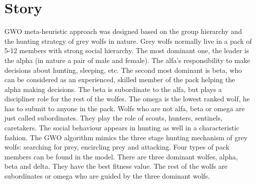 \documentclass[border=0.2cm]{report}
\begin{document}
\section{Story}

GWO \cite{gwo1} meta-heuristic approach was designed based on the group hierarchy and the hunting strategy of grey wolfs in nature. Grey wolfs normally live in a pack of 5-12 members with strong social hierarchy. The most dominant one, the leader is the alpha (in nature a pair of male and female). The alfa's responsibility to make decisions about hunting, sleeping, etc. The second most dominant is beta, who can be considered as an experienced, skilled member of the pack helping the alpha making decisions. The beta is subordinate to the alfa, but plays a discipliner role for the rest of the wolfes. The omega is the lowest ranked wolf, he has to submit to anyone in the pack. Wolfs who are not alfa, beta or omega are just called subordinates. They play the role of scouts, hunters, sentinels, caretakers. The social behaviour appears in hunting as well in a characteristic fashion. The GWO algorithm mimics the three stage hunting mechanism of grey wolfs: searching for prey, encircling prey and attacking. Four types of pack members can be found in the model. There are three dominant wolfes, alpha, beta and delta. They have the best fitness value. The rest of the wolfs are subordinates or omega who are guided by the three dominant wolfs. \\
\end{document}
